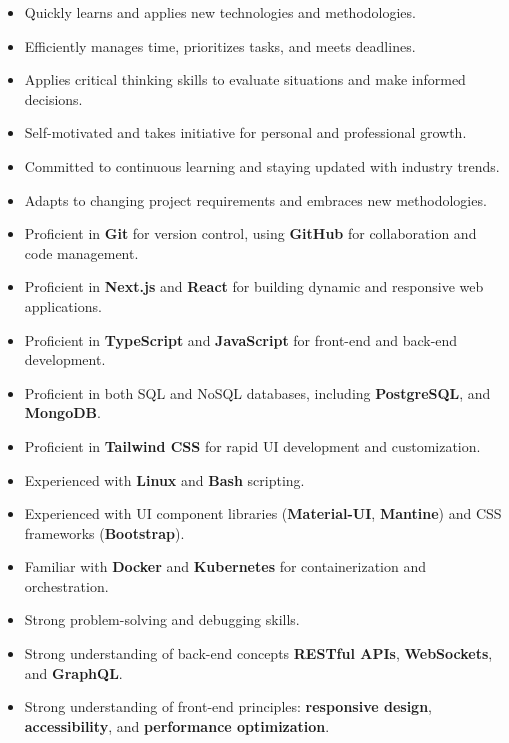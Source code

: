 \documentclass[9pt,a4paper,withhyper]{altacv}
\begin{document}
\begin{paracol}{2}
	\begin{itemize}
		\item Quickly learns and applies new technologies and methodologies.
		\item Efficiently manages time, prioritizes tasks, and meets deadlines.
		\item Applies critical thinking skills to evaluate situations and make informed decisions.
		\item Self-motivated and takes initiative for personal and professional growth.
		\item Committed to continuous learning and staying updated with industry trends.
		\item Adapts to changing project requirements and embraces new methodologies.
	\end{itemize}
	
	\divider
		
	\begin{itemize}
		\item Proficient in \textbf{Git} for version control, using \textbf{GitHub} for collaboration and code management.
		\item Proficient in \textbf{Next.js} and \textbf{React} for building dynamic and responsive web applications.
		\item Proficient in \textbf{TypeScript} and \textbf{JavaScript} for front-end and back-end development.
		\item Proficient in both SQL and NoSQL databases, including \textbf{PostgreSQL}, and \textbf{MongoDB}.
		\item Proficient in \textbf{Tailwind CSS} for rapid UI development and customization.
		\item Experienced with \textbf{Linux} and \textbf{Bash} scripting.
		\item Experienced with UI component libraries (\textbf{Material-UI}, \textbf{Mantine}) and CSS frameworks (\textbf{Bootstrap}).
		\item Familiar with \textbf{Docker} and \textbf{Kubernetes} for containerization and orchestration.
		\item Strong problem-solving and debugging skills.
		\item Strong understanding of back-end concepts \textbf{RESTful APIs}, \textbf{WebSockets}, and \textbf{GraphQL}.
		\item Strong understanding of front-end principles: \textbf{responsive design}, \textbf{accessibility}, and \textbf{performance optimization}.
	\end{itemize}
\end{paracol}
\end{document}
